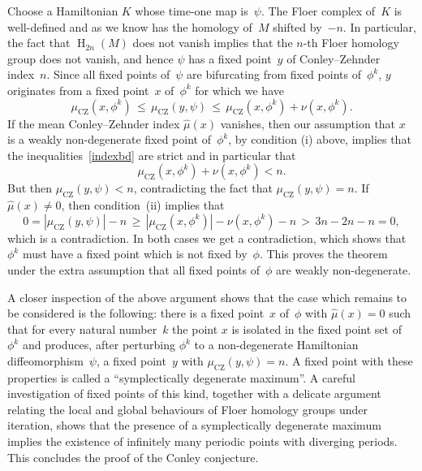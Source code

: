 \documentclass[12pt,twoside]{amsart}
\theoremstyle{plain}
\numberwithin{figure}{section}
\numberwithin{equation}{section}
\def\H{\operatorname{H}}
\def\sCZ{ {\scriptscriptstyle\operatorname{CZ}}}
\begin{document}
Choose a  Hamiltonian $K$ whose time-one map is~$\psi$. The Floer complex of~$K$ is well-defined 
and as we know has the homology of~$M$ shifted by~$-n$. In particular, the fact that $\H_{2n}(M)$ does not vanish implies that the $n$-th Floer homology group does not vanish, 
and hence $\psi$ has a fixed point~$y$ of Conley--Zehnder index~$n$. 
Since all fixed points of~$\psi$ are bifurcating from fixed points of~$\phi^k$, 
$y$ originates from a fixed point~$x$ of~$\phi^k$ for which we have
\[
\mu_{\sCZ}(x,\phi^k) \,\leqslant\, \mu_{\sCZ}(y,\psi) \,\leqslant\, 
\mu_{\sCZ}(x,\phi^k) + \nu(x,\phi^k).
\]
If the mean Conley--Zehnder index $\hat\mu (x)$ vanishes, then our assumption that $x$ is a weakly non-degenerate fixed point of~$\phi^k$, by condition (i) above, implies that the 
inequalities~\eqref{indexbd} are strict and in particular that
\[
\mu_{\sCZ}(x,\phi^k) + \nu(x,\phi^k) < n.
\]
But then $\mu_{\sCZ}(y,\psi) < n$, contradicting the fact that $\mu_{\sCZ}(y,\psi) =n$. 
If $\hat \mu (x) \neq 0$, 
then condition~(ii) implies that
\[
0 = |\mu_{\sCZ}(y,\psi)| - n \,\geqslant\, |\mu_{\sCZ}(x,\phi^k)| - \nu(x,\phi^k) - n 
\,>\, 3n - 2n - n = 0,
\]
which is a contradiction. In both cases we get a contradiction, which shows that $\phi^k$ must have 
a fixed point which is not fixed by~$\phi$. This proves the theorem under the extra assumption that all fixed points of~$\phi$ are weakly non-degenerate.

A closer inspection of the above argument shows that the case which remains to be considered is the following: there is a fixed point~$x$ of~$\phi$ with $\hat \mu (x)=0$ such that for every natural number~$k$ the point $x$ is isolated in the fixed point set of~$\phi^k$ and produces, 
after perturbing $\phi^k$ to a non-degenerate Hamiltonian diffeomorphism~$\psi$, 
a fixed point~$y$ with $\mu_{\sCZ}(y,\psi)=n$. A fixed point with these properties is called 
a ``symplectically degenerate maximum''. A careful investigation of fixed points of this kind, together with a delicate argument relating the local and global behaviours of Floer homology groups under iteration, shows that the presence of a symplectically degenerate maximum implies 
the existence of infinitely many periodic points with diverging periods. 
This concludes the proof of the Conley conjecture. 
\end{document}
